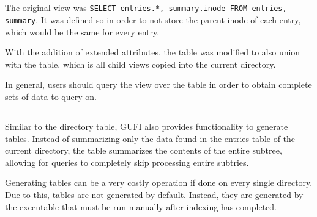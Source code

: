 \subsection{\pentries}
The original \pentries view was \texttt{SELECT entries.*,
  summary.inode FROM entries, summary}. It was defined so in order to
not store the parent inode of each entry, which would be the same for
every entry.

With the addition of extended attributes, the \pentries table was
modified to also union with the \pentriesrollup table, which is all
child \pentries views copied into the current directory.

In general, users should query the \pentries view over the \entries
table in order to obtain complete sets of data to query on.

\subsection{\treesummary}
Similar to the directory \summary table, GUFI also provides
functionality to generate \treesummary tables. Instead of summarizing
only the data found in the entries table of the current directory, the
\treesummary table summarizes the contents of the entire subtree,
allowing for queries to completely skip processing entire subtries.

Generating \treesummary tables can be a very costly operation if done
on every single directory. Due to this, \treesummary tables are not
generated by default. Instead, they are generated by the \bfti
executable that must be run manually after indexing has completed.
